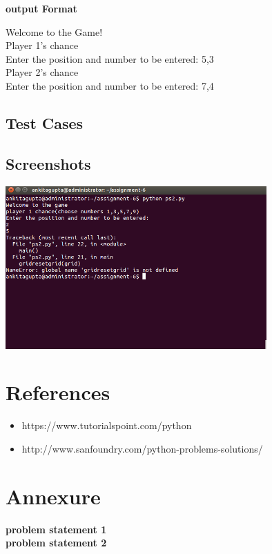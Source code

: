 \documentclass[a4paper,10pt]{report}
\begin{document}
\bf{output Format}

Welcome to the Game!\\
Player 1’s chance\\
Enter the position and number to be entered: 5,3\\
Player 2’s chance\\
Enter the position and number to be entered: 7,4\\






\subsection{Test Cases}
\subsection{Screenshots}

\includegraphics[width=100mm]{Screenshot from 2017-09-12 16:46:59.png}

\newpage
\section{References}
\begin{itemize}
\item https://www.tutorialspoint.com/python
\item http://www.sanfoundry.com/python-problems-solutions/
\end{itemize}

\newpage
\section{Annexure}
\bf{problem statement 1}\\

\newpage
\bf{problem statement 2}\\

\end{document}
